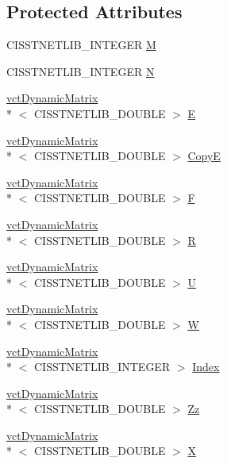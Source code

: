 \subsection*{Protected Attributes}
\begin{DoxyCompactItemize}
\item 
C\-I\-S\-S\-T\-N\-E\-T\-L\-I\-B\-\_\-\-I\-N\-T\-E\-G\-E\-R \hyperlink{classnmr_l_d_p_solver_af5eac8148f7f7cc21c6a91f525875c47}{M}
\item 
C\-I\-S\-S\-T\-N\-E\-T\-L\-I\-B\-\_\-\-I\-N\-T\-E\-G\-E\-R \hyperlink{classnmr_l_d_p_solver_abda6658672502493b5b4b28c0213d473}{N}
\item 
\hyperlink{classvct_dynamic_matrix}{vct\-Dynamic\-Matrix}\\*
$<$ C\-I\-S\-S\-T\-N\-E\-T\-L\-I\-B\-\_\-\-D\-O\-U\-B\-L\-E $>$ \hyperlink{classnmr_l_d_p_solver_a344c1e26e6c33572041e1260a3fe9365}{E}
\item 
\hyperlink{classvct_dynamic_matrix}{vct\-Dynamic\-Matrix}\\*
$<$ C\-I\-S\-S\-T\-N\-E\-T\-L\-I\-B\-\_\-\-D\-O\-U\-B\-L\-E $>$ \hyperlink{classnmr_l_d_p_solver_a421efd168683e0116dafff04eec37200}{Copy\-E}
\item 
\hyperlink{classvct_dynamic_matrix}{vct\-Dynamic\-Matrix}\\*
$<$ C\-I\-S\-S\-T\-N\-E\-T\-L\-I\-B\-\_\-\-D\-O\-U\-B\-L\-E $>$ \hyperlink{classnmr_l_d_p_solver_a0b71d56e0b8a6bbf2f1111d07cf59d36}{F}
\item 
\hyperlink{classvct_dynamic_matrix}{vct\-Dynamic\-Matrix}\\*
$<$ C\-I\-S\-S\-T\-N\-E\-T\-L\-I\-B\-\_\-\-D\-O\-U\-B\-L\-E $>$ \hyperlink{classnmr_l_d_p_solver_ae136de32bb183f7a4d33f5ac0a900130}{R}
\item 
\hyperlink{classvct_dynamic_matrix}{vct\-Dynamic\-Matrix}\\*
$<$ C\-I\-S\-S\-T\-N\-E\-T\-L\-I\-B\-\_\-\-D\-O\-U\-B\-L\-E $>$ \hyperlink{classnmr_l_d_p_solver_aced79c3137adca24863b074458cfe623}{U}
\item 
\hyperlink{classvct_dynamic_matrix}{vct\-Dynamic\-Matrix}\\*
$<$ C\-I\-S\-S\-T\-N\-E\-T\-L\-I\-B\-\_\-\-D\-O\-U\-B\-L\-E $>$ \hyperlink{classnmr_l_d_p_solver_a737657d4b69aef9cf571f9bdcf818d9c}{W}
\item 
\hyperlink{classvct_dynamic_matrix}{vct\-Dynamic\-Matrix}\\*
$<$ C\-I\-S\-S\-T\-N\-E\-T\-L\-I\-B\-\_\-\-I\-N\-T\-E\-G\-E\-R $>$ \hyperlink{classnmr_l_d_p_solver_a5dcd4ece4fd96ef31855281ea0555762}{Index}
\item 
\hyperlink{classvct_dynamic_matrix}{vct\-Dynamic\-Matrix}\\*
$<$ C\-I\-S\-S\-T\-N\-E\-T\-L\-I\-B\-\_\-\-D\-O\-U\-B\-L\-E $>$ \hyperlink{classnmr_l_d_p_solver_ab8b43ef98ca002bfc8d3b6ad4e6ac654}{Zz}
\item 
\hyperlink{classvct_dynamic_matrix}{vct\-Dynamic\-Matrix}\\*
$<$ C\-I\-S\-S\-T\-N\-E\-T\-L\-I\-B\-\_\-\-D\-O\-U\-B\-L\-E $>$ \hyperlink{classnmr_l_d_p_solver_a5868c434e5fef304f43ea90e8202d897}{X}
\end{DoxyCompactItemize}


